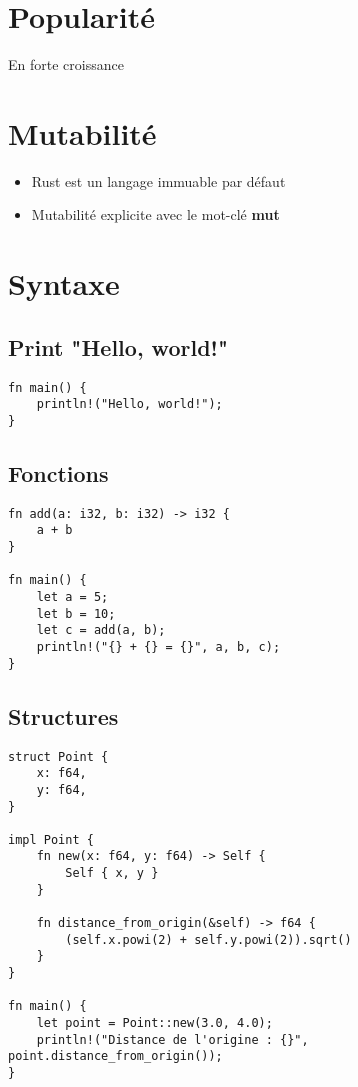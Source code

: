 \documentclass{article}
\begin{document}
\section{Popularité \cite{noauthor_introduction_nodate}}
En forte croissance

\section{Mutabilité \cite{noauthor_variables_nodate}}
\begin{itemize}
    \item Rust est un langage immuable par défaut
    \item Mutabilité explicite avec le mot-clé \textbf{mut}
\end{itemize}

\section{Syntaxe \cite{noauthor_introduction_nodate}}
\subsection{Print "Hello, world!"}
\begin{lstlisting}[]
fn main() {
    println!("Hello, world!");
}
\end{lstlisting}

\subsection{Fonctions}
\begin{lstlisting}[]
fn add(a: i32, b: i32) -> i32 {
    a + b
}

fn main() {
    let a = 5;
    let b = 10;
    let c = add(a, b);
    println!("{} + {} = {}", a, b, c);
}
\end{lstlisting}

\subsection{Structures}
\begin{lstlisting}[]
struct Point {
    x: f64,
    y: f64,
}

impl Point {
    fn new(x: f64, y: f64) -> Self {
        Self { x, y }
    }

    fn distance_from_origin(&self) -> f64 {
        (self.x.powi(2) + self.y.powi(2)).sqrt()
    }
}

fn main() {
    let point = Point::new(3.0, 4.0);
    println!("Distance de l'origine : {}", point.distance_from_origin());
}
\end{lstlisting}
\end{document}
